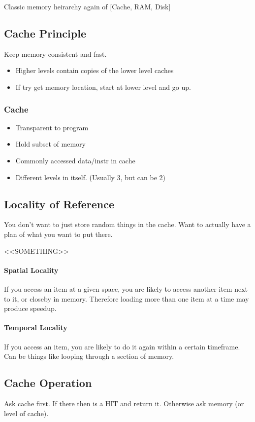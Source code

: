 \documentclass{article}
\begin{document}
		Classic memory heirarchy again of [Cache, RAM, Disk]

	\subsection*{Cache Principle}
		Keep memory consistent and fast.
		\begin{itemize}
			\item Higher levels contain copies of the lower level caches
			\item If try get memory location, start at lower level and go up.
		\end{itemize}

		\subsubsection*{Cache}
		\begin{itemize}
			\item Transparent to program
			\item Hold subset of memory
			\item Commonly accessed data/instr in cache
			\item Different levels in itself. (Usually 3, but can be 2)
		\end{itemize}

	\subsection*{Locality of Reference}
		You don't want to just store random things in the cache. Want to actually have a plan of what you want to put there.

		<<SOMETHING>>

		\paragraph{Spatial Locality}
		If you access an item at a given space, you are likely to access another item next to it, or closeby in memory. Therefore loading more than one item at a time may produce speedup. 

		\paragraph{Temporal Locality}
		If you access an item, you are likely to do it again within a certain timeframe. Can be things like looping through a section of memory.

	\subsection*{Cache Operation}
		Ask cache first. If there then is a HIT and return it. Otherwise ask memory (or level of cache).
\end{document}
